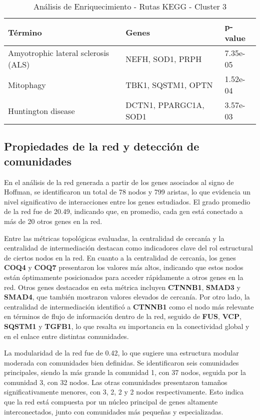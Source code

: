 \begin{table}[ht]
	\centering
	\caption{Análisis de Enriquecimiento - Rutas KEGG - Cluster 3}
	\begin{tabular}{|l|l|l|}
		\hline
		\textbf{Término} & \textbf{Genes} & \textbf{p-value} \\ \hline
		Amyotrophic lateral sclerosis (ALS) & NEFH, SOD1, PRPH & 7.35e-05 \\ \hline
		Mitophagy & TBK1, SQSTM1, OPTN & 1.52e-04 \\ \hline
		Huntington disease & DCTN1, PPARGC1A, SOD1 & 3.57e-03 \\ \hline
	\end{tabular}
\end{table}



\subsection{Propiedades de la red y detección de comunidades}

En el análisis de la red generada a partir de los genes asociados al signo de Hoffman, se identificaron un total de 78 nodos y 799 aristas, lo que evidencia un nivel significativo de interacciones entre los genes estudiados. El grado promedio de la red fue de 20.49, indicando que, en promedio, cada gen está conectado a más de 20 otros genes en la red.

Entre las métricas topológicas evaluadas, la centralidad de cercanía y la centralidad de intermediación destacan como indicadores clave del rol estructural de ciertos nodos en la red. En cuanto a la centralidad de cercanía, los genes \textbf{COQ4} y \textbf{COQ7} presentaron los valores más altos, indicando que estos nodos están óptimamente posicionados para acceder rápidamente a otros genes en la red. Otros genes destacados en esta métrica incluyen \textbf{CTNNB1}, \textbf{SMAD3} y \textbf{SMAD4}, que también mostraron valores elevados de cercanía. Por otro lado, la centralidad de intermediación identificó a \textbf{CTNNB1} como el nodo más relevante en términos de flujo de información dentro de la red, seguido de \textbf{FUS}, \textbf{VCP}, \textbf{SQSTM1} y \textbf{TGFB1}, lo que resalta su importancia en la conectividad global y en el enlace entre distintas comunidades.

La modularidad de la red fue de 0.42, lo que sugiere una estructura modular moderada con comunidades bien definidas. Se identificaron seis comunidades principales, siendo la más grande la comunidad 1, con 37 nodos, seguida por la comunidad 3, con 32 nodos. Las otras comunidades presentaron tamaños significativamente menores, con 3, 2, 2 y 2 nodos respectivamente. Esto indica que la red está compuesta por un núcleo principal de genes altamente interconectados, junto con comunidades más pequeñas y especializadas.

